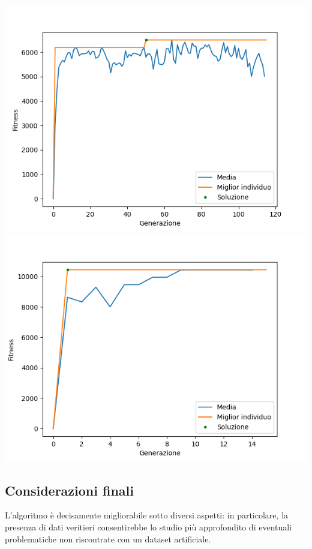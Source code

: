 \documentclass{CSUniSchoolLabReport}
\begin{document}
\begin{center}
	\includegraphics[scale=0.25]{results/18}
	\includegraphics[scale=0.25]{results/19}
	
\end{center}

\pagebreak{}

\subsection{Considerazioni finali}

L'algoritmo è decisamente migliorabile sotto diversi aspetti: in particolare, la presenza di dati veritieri consentirebbe lo studio più approfondito di eventuali problematiche non riscontrate con un dataset artificiale.
\end{document}
